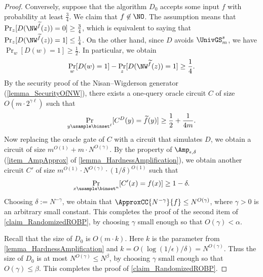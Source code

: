 \documentclass{toc}
\begin{document}
\begin{proof}
  Conversely, suppose that the algorithm $D_0$ accepts some input $f$ with probability at least $\frac{3}{4}$.
  We claim that $f \not\in \NO$. %
  The assumption means that
  $ \Pr_z[ D(\NW^{\widetilde{f}}(z)) = 0 ] \ge \frac{3}{4}$, which is equivalent to saying that $\Pr_z[ D(\NW^{\widetilde{f}}(z)) = 1 ] \le \frac{1}{4}$.
  On the other hand, since $D$ avoids $\UnivGS_m^s$, we have $\Pr_w [ D(w) = 1 ] \ge \frac{1}{2}$.
  In particular, we obtain
  \begin{align*}
    \Pr_w[ D(w) = 1 ] - \Pr_z[ D(\NW^{\widetilde{f}}(z)) = 1 ] \ge \frac{1}{4}.
  \end{align*}
  By the security proof of the Nisan--Wigderson generator (\cref{lemma_SecurityOfNW}),
  there exists a one-query oracle circuit $C$ of size $O(m \cdot 2^{\gamma \ell})$ such that
  \begin{align*}
    \Pr_{y \usample \binset^\ell}[ C^D(y) = {\widetilde{f}}(y) ]  \ge \frac{1}{2} + \frac{1}{4m}.
  \end{align*}
  Now replacing the oracle gate of $C$ with a circuit that simulates $D$,
  we obtain a circuit of size $m^{O(1)} + m \cdot N^{O(\gamma)}$.
  By the property of $\Amp_{\epsilon, \delta}$ (\cref{item_AmpApprox} of \cref{lemma_HardnessAmplification}),
  we obtain another circuit $C'$ of size $m^{O(1)} \cdot N^{O(\gamma)} \cdot (1/\delta)^{O(1)}$ such that
  $$
    \Pr_{x \usample \binset^n}[ C'(x) = f(x) ]  \ge 1 - \delta.
  $$
  Choosing $\delta := N^{-\gamma}$,
  we obtain that $\ApproxCC{N^{-\gamma}}{f} \le N^{O(\gamma)}$,
  where $\gamma > 0$ is an arbitrary small constant.
  This completes the proof of the second item of \cref{claim_RandomizedROBP},
  by choosing $\gamma$ small enough so that $O(\gamma) < \alpha$.

  Recall that the size of $D_0$ is $O(m \cdot k)$.
  Here $k$ is the parameter from \cref{lemma_HardnessAmplification} and $k = O( \log ( 1 / \epsilon ) / \delta ) = N^{O(\gamma)}$.
  Thus the size of $D_0$ is at most $N^{O(\gamma)} \le N^\beta$, by choosing $\gamma$ small enough so that $O(\gamma) \le \beta$.
  This completes the proof of \cref{claim_RandomizedROBP}.


\end{proof}
\end{document}
